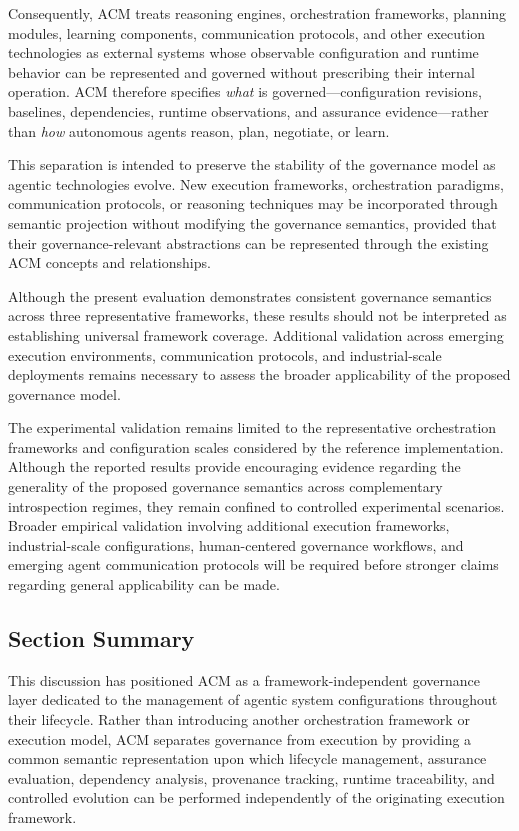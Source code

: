 \documentclass[10pt]{article}
\begin{document}
Consequently, ACM treats reasoning engines, orchestration frameworks, planning modules, learning components, communication protocols, and other execution technologies as external systems whose observable configuration and runtime behavior can be represented and governed without prescribing their internal operation. ACM therefore specifies \emph{what} is governed---configuration revisions, baselines, dependencies, runtime observations, and assurance evidence---rather than \emph{how} autonomous agents reason, plan, negotiate, or learn.

This separation is intended to preserve the stability of the governance model as agentic technologies evolve. New execution frameworks, orchestration paradigms, communication protocols, or reasoning techniques may be incorporated through semantic projection without modifying the governance semantics, provided that their governance-relevant abstractions can be represented through the existing ACM concepts and relationships.

Although the present evaluation demonstrates consistent governance semantics across three representative frameworks, these results should not be interpreted as establishing universal framework coverage. Additional validation across emerging execution environments, communication protocols, and industrial-scale deployments remains necessary to assess the broader applicability of the proposed governance model.

The experimental validation remains limited to the representative orchestration frameworks and configuration scales considered by the reference implementation. Although the reported results provide encouraging evidence regarding the generality of the proposed governance semantics across complementary introspection regimes, they remain confined to controlled experimental scenarios. Broader empirical validation involving additional execution frameworks, industrial-scale configurations, human-centered governance workflows, and emerging agent communication protocols will be required before stronger claims regarding general applicability can be made.

\subsection{Section Summary}

This discussion has positioned ACM as a framework-independent governance layer dedicated to the management of agentic system configurations throughout their lifecycle. Rather than introducing another orchestration framework or execution model, ACM separates governance from execution by providing a common semantic representation upon which lifecycle management, assurance evaluation, dependency analysis, provenance tracking, runtime traceability, and controlled evolution can be performed independently of the originating execution framework.
\end{document}
